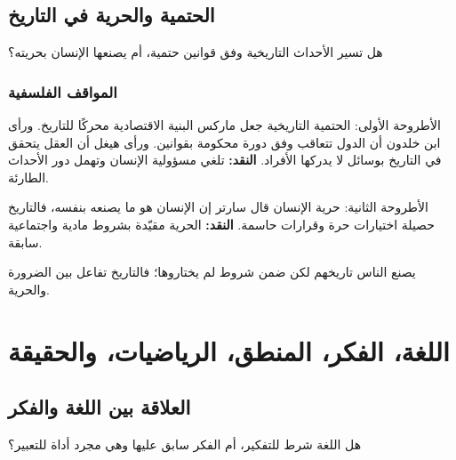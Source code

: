 \documentclass[12pt, twoside, openright]{book}
\newcommand{\setchap}[1]{\colorlet{chapcol}{#1}}
\begin{document}
\section{الحتمية والحرية في التاريخ}
\begin{problembox}
هل تسير الأحداث التاريخية وفق قوانين حتمية، أم يصنعها الإنسان بحريته؟
\end{problembox}
\subsection*{المواقف الفلسفية}
\begin{positionbox}{الأطروحة الأولى: الحتمية التاريخية}
جعل ماركس البنية الاقتصادية محركًا للتاريخ. ورأى ابن خلدون أن الدول تتعاقب وفق دورة محكومة بقوانين. ورأى هيغل أن العقل يتحقق في التاريخ بوسائل لا يدركها الأفراد. \textbf{النقد:} تلغي مسؤولية الإنسان وتهمل دور الأحداث الطارئة.
\end{positionbox}
\begin{positionbox}{الأطروحة الثانية: حرية الإنسان}
قال سارتر إن الإنسان هو ما يصنعه بنفسه، فالتاريخ حصيلة اختيارات حرة وقرارات حاسمة. \textbf{النقد:} الحرية مقيّدة بشروط مادية واجتماعية سابقة.
\end{positionbox}
\begin{synthbox}
يصنع الناس تاريخهم لكن ضمن شروط لم يختاروها؛ فالتاريخ تفاعل بين الضرورة والحرية.
\end{synthbox}

\setchap{colD}
\chapter{اللغة، الفكر، المنطق، الرياضيات، والحقيقة}

\section{العلاقة بين اللغة والفكر}
\begin{problembox}
هل اللغة شرط للتفكير، أم الفكر سابق عليها وهي مجرد أداة للتعبير؟
\end{problembox}
\end{document}
